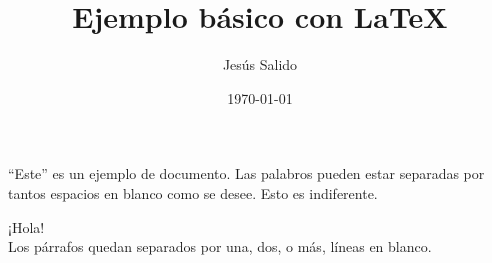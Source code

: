 \documentclass[11pt,a4paper]{article}
\title{Ejemplo básico con \LaTeX}
\author{Jesús Salido}
\date{\today}
\begin{document}
\maketitle


“Este” es un ejemplo de documento. Las     palabros        pueden estar       separadas por tantos         espacios     en blanco   como se desee. Esto es indiferente. 



¡Hola! \\[2cm]





           Los párrafos quedan separados por una, dos, o más, líneas en blanco.
           
           
\end{document}

